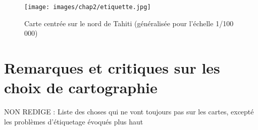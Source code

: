 \begin{figure}[!h]
\centering
\texttt{[image: images/chap2/etiquette.jpg]}
\caption{Carte centrée sur le nord de Tahiti (généralisée pour l'échelle 1/100 000)}
\label{100}
\end{figure}

\section{Remarques et critiques sur les choix de cartographie}
{\color{magenta} NON REDIGE : Liste des choses qui ne vont toujours pas sur les cartes, excepté les problèmes d'étiquetage évoqués plus haut}
